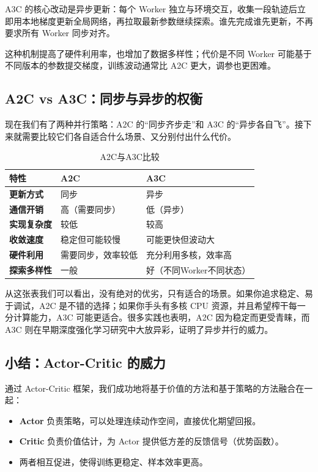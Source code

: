 \documentclass[lang=cn,zihao=-4,a4paper,fontset=windows]{beautybook}
\begin{document}
A3C 的核心改动是异步更新：每个 Worker 独立与环境交互，收集一段轨迹后立即用本地梯度更新全局网络，再拉取最新参数继续探索。谁先完成谁先更新，不再要求所有 Worker 同步对齐。

这种机制提高了硬件利用率，也增加了数据多样性；代价是不同 Worker 可能基于不同版本的参数提交梯度，训练波动通常比 A2C 更大，调参也更困难。

\subsection{A2C vs A3C：同步与异步的权衡}

现在我们有了两种并行策略：A2C 的“同步齐步走”和 A3C 的“异步各自飞”。接下来就需要比较它们各自适合什么场景、又分别付出什么代价。

\begin{table}[H]
\centering
\caption{A2C与A3C比较}
\begin{tabular}{p{}p{}p{}}
\toprule
\textbf{特性} & \textbf{A2C} & \textbf{A3C} \\
\midrule
\textbf{更新方式} & 同步 & 异步 \\
\textbf{通信开销} & 高（需要同步） & 低（异步） \\
\textbf{实现复杂度} & 较低 & 较高 \\
\textbf{收敛速度} & 稳定但可能较慢 & 可能更快但波动大 \\
\textbf{硬件利用} & 需要同步，效率较低 & 充分利用多核，效率高 \\
\textbf{探索多样性} & 一般 & 好（不同Worker不同状态） \\
\bottomrule
\end{tabular}
\end{table}

从这张表我们可以看出，没有绝对的优劣，只有适合的场景。如果你追求稳定、易于调试，A2C 是不错的选择；如果你手头有多核 CPU 资源，并且希望榨干每一分计算能力，A3C 可能更适合。很多实践也表明，A2C 因为稳定而更受青睐，而 A3C 则在早期深度强化学习研究中大放异彩，证明了异步并行的威力。

\subsection{小结：Actor-Critic 的威力}

通过 Actor-Critic 框架，我们成功地将基于价值的方法和基于策略的方法融合在一起：

\begin{itemize}
    \item \textbf{Actor} 负责策略，可以处理连续动作空间，直接优化期望回报。
    \item \textbf{Critic} 负责价值估计，为 Actor 提供低方差的反馈信号（优势函数）。
    \item 两者相互促进，使得训练更稳定、样本效率更高。
\end{itemize}
\end{document}
